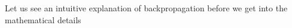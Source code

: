 \begin{frame}
\begin{columns}
    \begin{overlayarea}{\textwidth}{\textheight}
          \makebox[\textwidth][c]{\usebox{\figurethreecontent}}
    \end{overlayarea}
  \end{columns}
\end{frame}

\begin{frame}
  Let us see an intuitive explanation of backpropagation before we get into the mathematical details
\end{frame}

